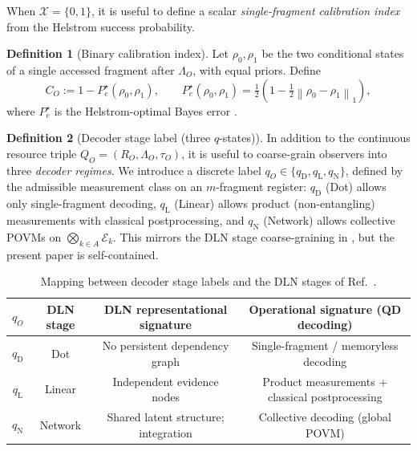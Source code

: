 \documentclass[aps,pra,twocolumn,superscriptaddress,nofootinbib]{revtex4-2}
\newcommand{\cE}{\mathcal{E}}
\newcommand{\cX}{\mathcal{X}}
\newcommand{\normone}[1]{\left\lVert #1\right\rVert_{1}}
\newcommand{\1}{\mathbf{1}}
\theoremstyle{definition}
\newtheorem{definition}{Definition}
\theoremstyle{plain}
\begin{document}
When $\cX=\{0,1\}$, it is useful to define a scalar \emph{single-fragment calibration index} from the Helstrom success probability.

\begin{definition}[Binary calibration index]
Let $\rho_0,\rho_1$ be the two conditional states of a single accessed fragment after $\Lambda_O$, with equal priors.
Define
\begin{equation}
C_O:=1-P_e^\star(\rho_0,\rho_1),\qquad
P_e^\star(\rho_0,\rho_1)=\tfrac12\left(1-\tfrac12\normone{\rho_0-\rho_1}\right),
\label{eq:calibration}
\end{equation}
where $P_e^\star$ is the Helstrom-optimal Bayes error \cite{Helstrom1976,Watrous2018}.
\end{definition}

\begin{definition}[Decoder stage label (three $q$-states)]
\label{def:q-states}
In addition to the continuous resource triple $Q_O=(R_O,\Lambda_O,\tau_O)$, it is useful to coarse-grain observers into three \emph{decoder regimes}.
We introduce a discrete label $q_O\in\{q_{\mathrm{D}},q_{\mathrm{L}},q_{\mathrm{N}}\}$, defined by the admissible measurement class on an $m$-fragment register:
$q_{\mathrm{D}}$ (Dot) allows only single-fragment decoding,
$q_{\mathrm{L}}$ (Linear) allows product (non-entangling) measurements with classical postprocessing, and
$q_{\mathrm{N}}$ (Network) allows collective POVMs on $\bigotimes_{k\in A}\cE_k$.
This mirrors the DLN stage coarse-graining in \cite{WuDLNCompression2026preprint}, but the present paper is self-contained.
\end{definition}

\begin{table}[t]
\caption{Mapping between decoder stage labels and the DLN stages of Ref.~\cite{WuDLNCompression2026preprint}.}
\label{tab:q-dln-mapping}
\begin{ruledtabular}
\begin{tabular}{cccc}
$q_O$ & DLN stage & DLN representational signature & Operational signature (QD decoding) \\
\hline
$q_{\mathrm{D}}$ & Dot    & No persistent dependency graph & Single-fragment / memoryless decoding \\
$q_{\mathrm{L}}$ & Linear & Independent evidence nodes     & Product measurements + classical postprocessing \\
$q_{\mathrm{N}}$ & Network& Shared latent structure; integration & Collective decoding (global POVM) \\
\end{tabular}
\end{ruledtabular}
\end{table}
\end{document}
